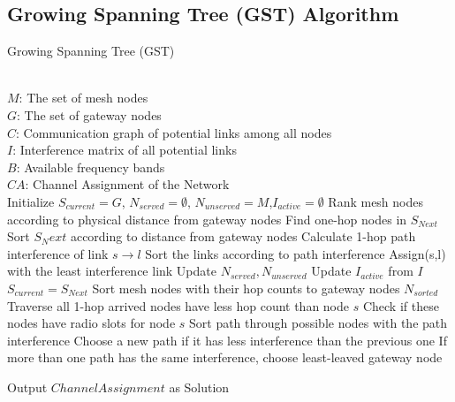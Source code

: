 \subsection{Growing Spanning Tree (GST) Algorithm}
\label{subsec:GST}
\begin{algorithm}[t]
\small
\caption{Growing Spanning Tree (GST)}
\label{algorithms:gst}
\begin{algorithmic}[1]
\REQUIRE  ~~\\
	 $M$: The set of mesh nodes\\
	 $G$: The set of gateway nodes\\
	 $C$: Communication graph of potential links among all nodes\\
	 $I$: Interference matrix of all potential links \\
	 $B$: Available frequency bands
\ENSURE ~~\\    
$CA$: Channel Assignment of the Network\\
\STATE Initialize $S_{current}=G$, $N_{served}=\emptyset$, $N_{unserved}=M$,$I_{active}=\emptyset$
\STATE Rank mesh nodes according to physical distance from gateway nodes
	\STATE Find one-hop nodes in $S_{Next}$
	\STATE Sort $S_Next$ according to distance from gateway nodes
		\STATE Calculate 1-hop path interference of link $s\rightarrow l$
		\STATE Sort the links according to path interference
		\STATE Assign(s,l) with the least interference link
		\STATE Update $N_{served},N_{unserved}$
		\STATE Update $I_{active}$ from $I$
	\ENDFOR
	\STATE $S_{current}=S_{Next}$
\ENDFOR
\ENDWHILE
\STATE Sort mesh nodes with their hop counts to gateway nodes $N_{sorted}$
	\STATE Traverse all 1-hop arrived nodes have less hop count than node $s$ 
	\STATE Check if these nodes have radio slots for node $s$
	\STATE Sort path through possible nodes with the path interference
	\STATE Choose a new path if it has less interference than the previous one
	\STATE If more than one path has the same interference, choose least-leaved gateway node
\ENDFOR
\ENDWHILE

Output $Channel Assignment$ as Solution
\end{algorithmic}
\end{algorithm}


